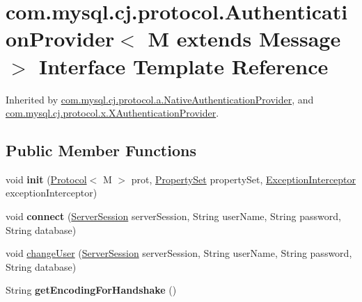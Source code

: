 \hypertarget{interfacecom_1_1mysql_1_1cj_1_1protocol_1_1_authentication_provider}{}\section{com.\+mysql.\+cj.\+protocol.\+Authentication\+Provider$<$ M extends Message $>$ Interface Template Reference}
\label{interfacecom_1_1mysql_1_1cj_1_1protocol_1_1_authentication_provider}


Inherited by \mbox{\hyperlink{classcom_1_1mysql_1_1cj_1_1protocol_1_1a_1_1_native_authentication_provider}{com.\+mysql.\+cj.\+protocol.\+a.\+Native\+Authentication\+Provider}}, and \mbox{\hyperlink{classcom_1_1mysql_1_1cj_1_1protocol_1_1x_1_1_x_authentication_provider}{com.\+mysql.\+cj.\+protocol.\+x.\+X\+Authentication\+Provider}}.

\subsection*{Public Member Functions}
\begin{DoxyCompactItemize}
\item 
\mbox{\label{interfacecom_1_1mysql_1_1cj_1_1protocol_1_1_authentication_provider_a8806f98d0408eaad74edc0784fc78825}} 
void {\bfseries init} (\mbox{\hyperlink{interfacecom_1_1mysql_1_1cj_1_1protocol_1_1_protocol}{Protocol}}$<$ M $>$ prot, \mbox{\hyperlink{interfacecom_1_1mysql_1_1cj_1_1conf_1_1_property_set}{Property\+Set}} property\+Set, \mbox{\hyperlink{interfacecom_1_1mysql_1_1cj_1_1exceptions_1_1_exception_interceptor}{Exception\+Interceptor}} exception\+Interceptor)
\item 
\mbox{\label{interfacecom_1_1mysql_1_1cj_1_1protocol_1_1_authentication_provider_a9fa5f015000ed27fdd7e6397317fe423}} 
void {\bfseries connect} (\mbox{\hyperlink{interfacecom_1_1mysql_1_1cj_1_1protocol_1_1_server_session}{Server\+Session}} server\+Session, String user\+Name, String password, String database)
\item 
void \mbox{\hyperlink{interfacecom_1_1mysql_1_1cj_1_1protocol_1_1_authentication_provider_a166772168a0573ba2f186e49c41b0aec}{change\+User}} (\mbox{\hyperlink{interfacecom_1_1mysql_1_1cj_1_1protocol_1_1_server_session}{Server\+Session}} server\+Session, String user\+Name, String password, String database)
\item 
\mbox{\label{interfacecom_1_1mysql_1_1cj_1_1protocol_1_1_authentication_provider_ad030b0dc0784302f1221945aef2ae2e7}} 
String {\bfseries get\+Encoding\+For\+Handshake} ()
\end{DoxyCompactItemize}
